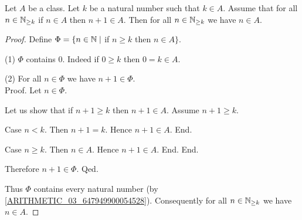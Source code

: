 \documentclass[10pt]{article}
\begin{document}
  \begin{forthel}
    \begin{theorem}
      Let $A$ be a class.
      Let $k$ be a natural number such that $k \in A$.
      Assume that for all $n \in \mathbb{N}_{\geq k}$ if $n \in A$ then $n + 1 \in A$.
      Then for all $n \in \mathbb{N}_{\geq k}$ we have $n \in A$.
    \end{theorem}
    \begin{proof}
      Define $\Phi = \{n \in \mathbb{N} \mid$ if $n \geq k$ then $n \in A \}$.

      (1) $\Phi$ contains $0$.
      Indeed if $0 \geq k$ then $0 = k \in A$.

      (2) For all $n \in \Phi$ we have $n + 1 \in \Phi$. \\
      Proof.
        Let $n \in \Phi$.

        Let us show that if $n + 1 \geq k$ then $n + 1 \in A$.
          Assume $n + 1 \geq k$.

          Case $n < k$.
            Then $n + 1 = k$.
            Hence $n + 1 \in A$.
          End.

          Case $n \geq k$.
            Then $n \in A$.
            Hence $n + 1 \in A$.
          End.
        End.

        Therefore $n + 1 \in \Phi$.
      Qed.

      Thus $\Phi$ contains every natural number (by \cref{ARITHMETIC_03_647949900054528}).
      Consequently for all $n \in \mathbb{N}_{\geq k}$ we have $n \in A$.
    \end{proof}
  \end{forthel}
\end{document}
